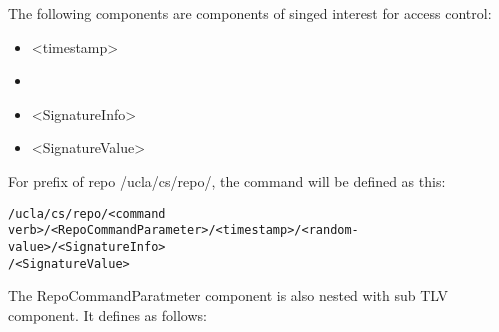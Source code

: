 \documentclass{acm_proc_article-sp}
\begin{document}
The following components are components of singed interest for access control:
\begin{itemize}
\item <timestamp>
\item <random-value>
\item <SignatureInfo>
\item <SignatureValue>
\end{itemize}

For prefix of repo /ucla/cs/repo/, the command will be defined as this:

\begin{figure*}
\begin{framed}
\begin{BVerbatim}
/ucla/cs/repo/<command verb>/<RepoCommandParameter>/<timestamp>/<random-value>/<SignatureInfo>
/<SignatureValue>
\end{BVerbatim}
\end{framed}
\end{figure*}

The RepoCommandParatmeter component is also nested with sub TLV component. It defines as follows:
\end{document}
